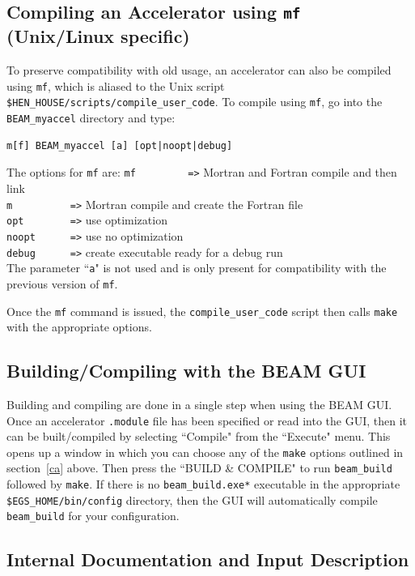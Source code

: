 \documentclass[12pt,twoside]{article}
\begin{document}
\subsection{Compiling an Accelerator using {\tt mf} (Unix/Linux specific)}
To preserve compatibility with old usage, an accelerator can also be
compiled using {\tt mf}, which is aliased to the Unix script
{\tt \$HEN\_HOUSE/scripts/compile\_user\_code}.  To compile using
{\tt mf}, go into the {\tt BEAM\_myaccel} directory and type:

\begin{verbatim}
m[f] BEAM_myaccel [a] [opt|noopt|debug]
\end{verbatim}
The options for {\tt mf} are:
\verb+mf         =>+ Mortran and Fortran compile and then link\\
\verb+m          =>+ Mortran compile and create the Fortran file\\
\verb+opt        =>+ use optimization\\
\verb+noopt      =>+ use no optimization\\
\verb+debug      =>+ create executable ready for a debug run\\
The parameter ``{\tt a}" is not used and is only present for compatibility
with the previous version of {\tt mf}.

Once the {\tt mf} command is issued, the {\tt compile\_user\_code}
script then calls {\tt make} with the appropriate options.

\subsection{Building/Compiling with the BEAM GUI}
Building and compiling are done in a single step when using the BEAM GUI.
Once an accelerator {\tt .module} file has been specified or read into
the GUI, then it can be built/compiled by selecting ``Compile" from
the ``Execute" menu.  This opens up a window in which you can choose any
of the {\tt make} options outlined in section~\ref{ca} above.  Then
press the ``BUILD \& COMPILE" to run {\tt beam\_build} followed by
{\tt make}.  If there
is no {\tt beam\_build.exe*} executable in the appropriate
{\tt \$EGS\_HOME/bin/config} directory, then the GUI will automatically
compile {\tt beam\_build} for your configuration.

\subsection[Internal Documentation \& Input Description]{Internal Documentation and Input Description}
\end{document}
